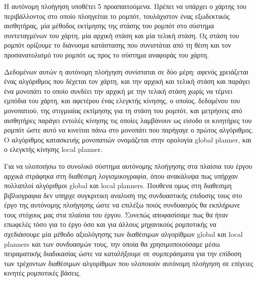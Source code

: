 \documentclass[a4paper,10pt]{article}
\begin{document}
Η αυτόνομη πλοήγηση υποθέτει 5 προαπαιτούμενα. Πρέπει να υπάρχει ο χάρτης του
περιβάλλοντος στο οποίο πλοηγείται το ρομπότ, τουλάχιστον ένας εξωδεκτικός
αισθητήρας, μία μέθοδος εκτίμησης της στάσης του ρομπότ στο σύστημα
συντεταγμένων του χάρτη, μία αρχική στάση και μία τελική στάση. Ως στάση του
ρομπότ ορίζουμε το διάνυσμα κατάστασης που συνιστάται από τη θέση και τον
προσανατολισμό του ρομπότ ως προς το σύστημα αναφοράς του χάρτη.

Δεδομένων αυτών η αυτόνομη πλοήγηση συνίσταται σε δύο μέρη: αφενός χρειάζεται
ένας αλγόριθμος που δέχεται τον χάρτη, και την αρχική και τελική στάση και
παράγει ένα μονοπάτι το οποίο συνδέει την αρχική με την τελική στάση χωρίς να
τέμνει εμπόδια του χάρτη, και αφετέρου ένας ελεγκτής κίνησης, ο οποίος,
δεδομένου του μονοπατιού, της στιγμιαίας εκτίμησης για τη στάση του ρομπότ, και
μετρήσεις από αισθητήρες παράγει εντολές κίνησης τις οποίες λαμβάνουν ως είσοδο
οι κινητήρες του ρομπότ ώστε αυτό να κινείται πάνω στο μονοπάτι που παρήγαγε ο
πρώτος αλγόριθμος. Ο αλγόριθμος κατασκευής μονοπατιών ονομάζεται στην ορολογία
global planner, και ο ελεγκτής κίνησης local planner.

Για να υλοποιήσω το συνολικό σύστημα αυτόνομης πλοήγησης στα πλαίσια του έργου
αρχικά στράφηκα στη διαθέσιμη λογισμικογραφία, όπου ανακάλυψα πως υπήρχαν
πολλαπλοί αλγόριθμοι global και local planners. Πουθενα ομως στη διαθεσιμη
βιβλιογραφια δεν υπηρχε συγκριτικη αναλυση της συνδυαστικής επιδοσης τους στο
έργο της αυτόνομης πλοήγησης ώστε να επιλέξω ποιός συνδυασμός θα εκπλήρωνε τους
στόχους μας στα πλαίσια του έργου. Συνεπώς αποφασίσαμε πως θα ήταν επωφελές
τόσο για το έργο όσο και για άλλους μηχανικούς ρομποτικής να σχεδιάσουμε μία
μέθοδο αξιολόγησης των διαθέσιμων αλγορίθμων global και local planners και των
συνδυασμών τους, την οποία θα χρησιμοποιούσαμε μέσω πειραματικής διαδικασίας
ώστε να καταλήξουμε σε συμπεράσματα για την επίδοση των τρέχοντων διαθέσιμων
αλγορίθμων που υλοποιούν αυτόνομη πλοήγηση σε επίγειες κινητές ρομποτικές
βάσεις.
\end{document}
